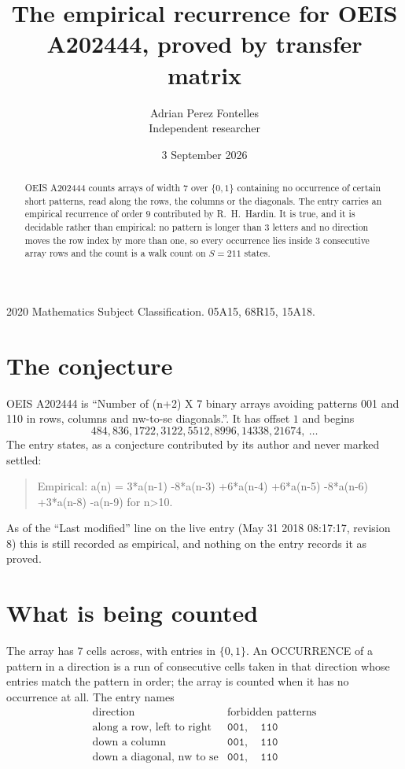 \documentclass[11pt,a4paper]{article}
\title{The empirical recurrence for OEIS A202444, proved by transfer matrix}
\author{Adrian Perez Fontelles\\ \small Independent researcher}
\date{3 September 2026}
\theoremstyle{plain}
\theoremstyle{definition}
\begin{document}
\maketitle

\begin{abstract}
OEIS A202444 counts arrays of width $7$ over $\{0,1\}$ containing no occurrence of certain short
patterns, read along the rows, the columns or the diagonals. The entry carries an empirical
recurrence of order $9$ contributed by R.~H.~Hardin. It is true, and it is decidable
rather than empirical: no pattern is longer than $3$ letters and no direction moves the row
index by more than one, so every occurrence lies inside $3$ consecutive array rows and the
count is a walk count on $S=211$ states.
\end{abstract}

\noindent\small 2020 Mathematics Subject Classification. 05A15, 68R15, 15A18.\normalsize

\section{The conjecture}

OEIS A202444 is ``Number of (n+2) X 7 binary arrays avoiding patterns 001 and 110 in rows, columns and nw-to-se diagonals.''. It has offset $1$ and begins
\[
484, 836, 1722, 3122, 5512, 8996, 14338, 21674,\ \dots
\]
The entry states, as a conjecture contributed by its author and never marked settled:
\begin{quote}
Empirical: a(n) = 3*a(n-1) -8*a(n-3) +6*a(n-4) +6*a(n-5) -8*a(n-6) +3*a(n-8) -a(n-9) for n>10.
\end{quote}
As of the ``Last modified'' line on the live entry (May 31 2018 08:17:17, revision 8) this is still
recorded as empirical, and nothing on the entry records it as proved.

\section{What is being counted}

The array has $7$ cells across, with entries in $\{0,1\}$. An OCCURRENCE of a pattern in a
direction is a run of consecutive cells taken in that direction whose entries match the pattern
in order; the array is counted when it has no occurrence at all. The entry names
\[
\begin{array}{ll}
\text{direction} & \text{forbidden patterns} \\[2pt]
\text{along a row, left to right} & \mathtt{001},\quad \mathtt{110} \\
\text{down a column} & \mathtt{001},\quad \mathtt{110} \\
\text{down a diagonal, nw to se} & \mathtt{001},\quad \mathtt{110} \\
\end{array}
\]
\end{document}
